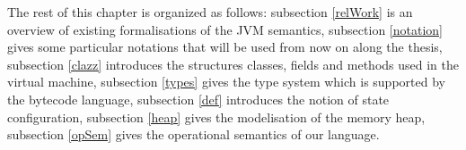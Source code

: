   
 The rest of this chapter is organized as follows:
 subsection \ref{relWork} is an overview of existing formalisations of the JVM semantics,
 subsection \ref{notation} gives some particular notations that will be used from now on along the thesis,
 subsection \ref{clazz} introduces the structures classes, fields and methods  used in the virtual machine, 
 subsection \ref{types} gives the type system which is supported by the bytecode language,
 subsection \ref{def} introduces the notion of state configuration,
 subsection \ref{heap} gives the modelisation of the memory heap,
 subsection \ref{opSem} gives the operational semantics of our language.

